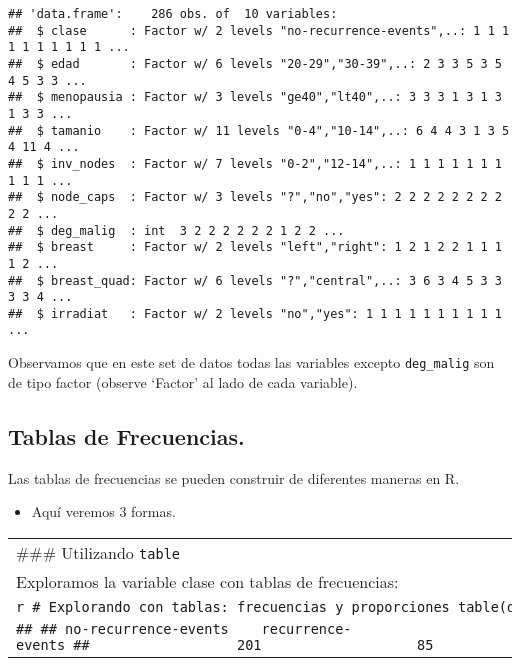 \documentclass[
]{article}
\providecommand{\tightlist}{%
  \setlength{\itemsep}{0pt}\setlength{\parskip}{0pt}}
\begin{document}
\begin{verbatim}
## 'data.frame':    286 obs. of  10 variables:
##  $ clase      : Factor w/ 2 levels "no-recurrence-events",..: 1 1 1 1 1 1 1 1 1 1 ...
##  $ edad       : Factor w/ 6 levels "20-29","30-39",..: 2 3 3 5 3 5 4 5 3 3 ...
##  $ menopausia : Factor w/ 3 levels "ge40","lt40",..: 3 3 3 1 3 1 3 1 3 3 ...
##  $ tamanio    : Factor w/ 11 levels "0-4","10-14",..: 6 4 4 3 1 3 5 4 11 4 ...
##  $ inv_nodes  : Factor w/ 7 levels "0-2","12-14",..: 1 1 1 1 1 1 1 1 1 1 ...
##  $ node_caps  : Factor w/ 3 levels "?","no","yes": 2 2 2 2 2 2 2 2 2 2 ...
##  $ deg_malig  : int  3 2 2 2 2 2 2 1 2 2 ...
##  $ breast     : Factor w/ 2 levels "left","right": 1 2 1 2 2 1 1 1 1 2 ...
##  $ breast_quad: Factor w/ 6 levels "?","central",..: 3 6 3 4 5 3 3 3 3 4 ...
##  $ irradiat   : Factor w/ 2 levels "no","yes": 1 1 1 1 1 1 1 1 1 1 ...
\end{verbatim}

Observamos que en este set de datos todas las variables excepto
\texttt{deg\_malig} son de tipo factor (observe `Factor' al lado de cada
variable).

\hypertarget{tablas-de-frecuencias.}{%
\subsection{Tablas de Frecuencias.}\label{tablas-de-frecuencias.}}

Las tablas de frecuencias se pueden construir de diferentes maneras en
R.

\begin{itemize}
\tightlist
\item
  Aquí veremos 3 formas.
\end{itemize}

\begin{longtable}[]{@{}l@{}}
\toprule
\endhead
\begin{minipage}[t]{0.04\columnwidth}\raggedright
\#\#\# Utilizando \texttt{table}\strut
\end{minipage}\tabularnewline
\begin{minipage}[t]{0.04\columnwidth}\raggedright
Exploramos la variable clase con tablas de frecuencias:\strut
\end{minipage}\tabularnewline
\begin{minipage}[t]{0.04\columnwidth}\raggedright
\texttt{r\ \#\ Explorando\ con\ tablas:\ frecuencias\ y\ proporciones\ table(datos\$clase)}\strut
\end{minipage}\tabularnewline
\begin{minipage}[t]{0.04\columnwidth}\raggedright
\texttt{\#\#\ \#\#\ no-recurrence-events\ \ \ \ recurrence-events\ \#\#\ \ \ \ \ \ \ \ \ \ \ \ \ \ \ \ \ \ 201\ \ \ \ \ \ \ \ \ \ \ \ \ \ \ \ \ \ \ 85}\strut
\end{minipage}\tabularnewline
\bottomrule
\end{longtable}
\end{document}
